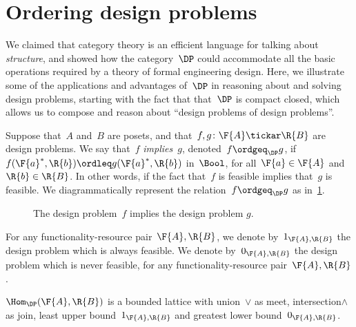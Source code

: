 \section{Ordering design problems}

We claimed that category theory is an efficient language for talking about \emph{structure}, and showed how the category~$\DP$ could accommodate all the basic operations required by a theory of formal engineering design. Here, we illustrate some of the applications and advantages of~$\DP$ in reasoning about and solving design problems, starting with the fact that that~$\DP$ is compact closed, which allows us to compose and reason about ``design problems of design problems''.

\begin{definition}[Order on~$\DP$]
\label{def:DP_loc_pos}

Suppose that~$A$ and~$B$ are posets, and that~$f,g \colon \F{A} \tickar \R{B}$ are design problems. We say that~$f$ \emph{implies}~$g$, denoted~$f \ordgeq_{\DP} g$, if~$f(\F{a}^*,\R{b}) \ordleq g(\F{a}^*,\R{b} )$ in~$\Bool$, for all~$\F{a} \in \F{A}$
and~$\R{b} \in \R{B}$. In other words, if the fact that~$f$ is feasible implies that~$g$ is feasible. We diagrammatically represent the relation~$f \ordgeq_{\DP} g$ as in~\cref{fig:dpimplies}.

\begin{figure}[h!]
\begin{center}
\end{center}
\caption{The design problem~$f$ implies the design problem $g$. \label{fig:dpimplies}}
\end{figure}
\end{definition}

\begin{remark}
For any functionality-resource pair~$\F{A},\R{B}$, we denote by~$1_{\F{A},\R{B}}$ the design problem which is always feasible. We denote by~$0_{\F{A},\R{B}}$ the design problem which is never feasible, for any functionality-resource pair~$\F{A},\R{B}$.
\end{remark}
\begin{lemma}
\label{lemma:dpboundedlattice}
$\Hom_\DP(\F{A},\R{B})$ is a bounded lattice with union~$\vee$ as meet, intersection$\wedge$ as join, least upper bound~$1_{\F{A},\R{B}}$ and greatest lower bound~$0_{\F{A},\R{B}}$.
\end{lemma}

